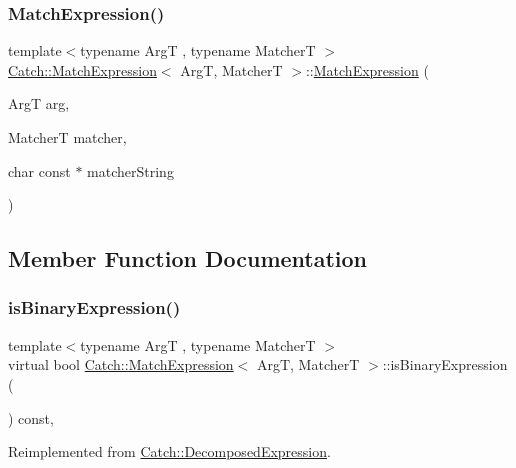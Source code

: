 \subsubsection{\texorpdfstring{Match\+Expression()}{MatchExpression()}}
{\footnotesize\ttfamily template$<$typename ArgT , typename MatcherT $>$ \\
\mbox{\hyperlink{class_catch_1_1_match_expression}{Catch\+::\+Match\+Expression}}$<$ ArgT, MatcherT $>$\+::\mbox{\hyperlink{class_catch_1_1_match_expression}{Match\+Expression}} (\begin{DoxyParamCaption}\item[{ArgT}]{arg,  }\item[{MatcherT}]{matcher,  }\item[{char const $\ast$}]{matcher\+String }\end{DoxyParamCaption})\hspace{0.3cm}{\ttfamily [inline]}}



\subsection{Member Function Documentation}
\mbox{\label{class_catch_1_1_match_expression_ac4edf6e9a6e5762a487db1486d0d1f45}} 
\subsubsection{\texorpdfstring{is\+Binary\+Expression()}{isBinaryExpression()}}
{\footnotesize\ttfamily template$<$typename ArgT , typename MatcherT $>$ \\
virtual bool \mbox{\hyperlink{class_catch_1_1_match_expression}{Catch\+::\+Match\+Expression}}$<$ ArgT, MatcherT $>$\+::is\+Binary\+Expression (\begin{DoxyParamCaption}{ }\end{DoxyParamCaption}) const\hspace{0.3cm}{\ttfamily [inline]}, {\ttfamily [virtual]}}



Reimplemented from \mbox{\hyperlink{struct_catch_1_1_decomposed_expression_a1c458ece47b71f093290dbdf9bb31fdb}{Catch\+::\+Decomposed\+Expression}}.

